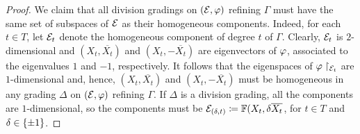 \begin{proof}
    We claim that all division gradings on $(\mathcal E, \varphi)$ refining $\Gamma$ must have the same set of subspaces of $\mathcal E$ as their homogeneous components. 
    Indeed, for each $t\in T$, let $\mathcal E_t$ denote the homogeneous component of degree $t$ of $\Gamma$. 
    Clearly, $\mathcal E_t$ is $2$-dimensional and $(X_t, \overline{X_t})$ and $(X_t, -\overline{X_t})$ are eigenvectors of $\varphi$, associated to the eigenvalues $1$ and $-1$, respectively. 
    It follows that the eigenspaces of $\varphi \restriction_{\mathcal E_t}$ are $1$-dimensional and, hence, $(X_t, \overline{X_t})$ and $(X_t, -\overline{X_t})$ must be homogeneous in any grading $\Delta$ on $(\mathcal E, \varphi)$ refining $\Gamma$. 
    If $\Delta$ is a division grading, all the components are $1$-dimensional, so the components must be $\mathcal E_{(\delta, t)} \coloneqq \mathbb{F} (X_t, \delta \overline{X_t}$, for $t\in T$ and $\delta \in \{ \pm 1 \}$.
    
    
    

\end{proof}
